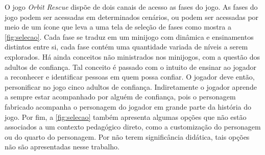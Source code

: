 \vspace{-0.3cm}


O jogo \textit{Orbit Rescue} dispõe de dois canais de acesso as fases do jogo. As fases do jogo podem ser acessadas em determinados cenários, ou podem ser acessadas por meio de um ícone que leva a uma tela de seleção de fases como mostra a \autoref{fig:selecao}. Cada fase se traduz em um minijogo com dinâmica e ensinamentos distintos entre si, cada fase contém uma quantidade variada de níveis a serem explorados. Há ainda conceitos não ministrados nos minijogos, com a questão dos adultos de confiança. Tal conceito é passado com o intuito de ensinar ao jogador a reconhecer e identificar pessoas em quem possa confiar. O jogador deve então, personificar no jogo cinco adultos de confiança. Indiretamente o jogador aprende a sempre estar acompanhado por alguém de confiança, pois o personagem fabricado acompanha o personagem do jogador em grande parte da história do jogo. Por fim, a \autoref{fig:selecao} também apresenta algumas opções que não estão associados a um contexto pedagógico direto, como a customização do personagem ou do quarto do personagem. Por não terem significância didática, tais opções não são apresentadas nesse trabalho. 


